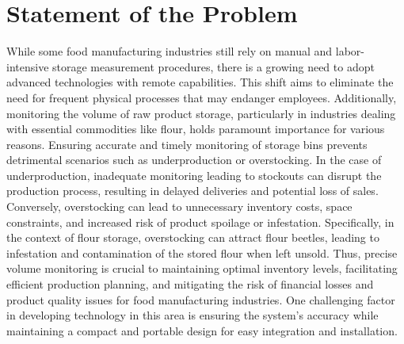 \section{Statement of the Problem}
\label{intro:sec:Statement of the Problem}

While some food manufacturing industries still rely on manual and labor-intensive storage measurement procedures, there is a growing need to adopt advanced technologies with remote capabilities. This shift aims to eliminate the need for frequent physical processes that may endanger employees. Additionally, monitoring the volume of raw product storage, particularly in industries dealing with essential commodities like flour, holds paramount importance for various reasons. Ensuring accurate and timely monitoring of storage bins prevents detrimental scenarios such as underproduction or overstocking. In the case of underproduction, inadequate monitoring leading to stockouts can disrupt the production process, resulting in delayed deliveries and potential loss of sales. Conversely, overstocking can lead to unnecessary inventory costs, space constraints, and increased risk of product spoilage or infestation. Specifically, in the context of flour storage, overstocking can attract flour beetles, leading to infestation and contamination of the stored flour when left unsold. Thus, precise volume monitoring is crucial to maintaining optimal inventory levels, facilitating efficient production planning, and mitigating the risk of financial losses and product quality issues for food manufacturing industries. One challenging factor in developing technology in this area is ensuring the system's accuracy while maintaining a compact and portable design for easy integration and installation.

